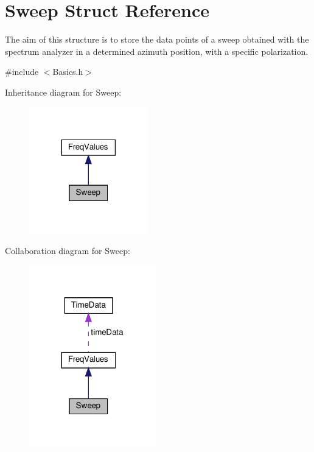 \hypertarget{structSweep}{}\section{Sweep Struct Reference}
\label{structSweep}


The aim of this structure is to store the data points of a sweep obtained with the spectrum analyzer in a determined azimuth position, with a specific polarization.  




{\ttfamily \#include $<$Basics.\+h$>$}



Inheritance diagram for Sweep\+:
\nopagebreak
\begin{figure}[H]
\begin{center}
\leavevmode
\includegraphics[width=146pt]{structSweep__inherit__graph}
\end{center}
\end{figure}


Collaboration diagram for Sweep\+:
\nopagebreak
\begin{figure}[H]
\begin{center}
\leavevmode
\includegraphics[width=156pt]{structSweep__coll__graph}
\end{center}
\end{figure}
